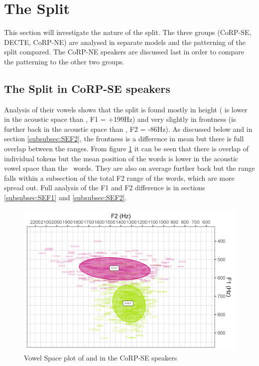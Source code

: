 \documentclass[../../../00.FullDoc/tex/ThesisSkeleton-draft2]{subfiles}
\begin{document}
\section{The  Split}	 \label{sec:FSSplit}
This section will investigate the nature of the \FS split. The three groups (CoRP-SE, DECTE, CoRP-NE) are analysed in separate models and the patterning of the \FS split compared. The CoRP-NE speakers are discussed last in order to compare the patterning to the other two groups.

\subsection{The  Split in CoRP-SE speakers}
Analysis of their vowels shows that the split is found mostly in height (\strutt{} is lower in the acoustic space than \foot{}, F1 = +199Hz) and very slightly in frontness (\strutt is further back in the acoustic space than \foot{}, F2 = -86Hz). As discussed below and in section \ref{subsubsec:SEF2}, the frontness is a difference in mean but there is full overlap between the ranges.
From figure \ref{fig:FSvplotSE} it can be seen that there is overlap of individual tokens but the mean position of the \strutt{} words is lower in the acoustic vowel space than the \foot\ words. They are also on average further back but the range falls within a subsection of the total F2 range of the  \foot{} words, which are more spread out.
Full analysis of the F1 and F2 difference is in sections \ref{subsubsec:SEF1} and \ref{subsubsec:SEF2}.


\begin{figure}[h]
	\centering
	\includegraphics[width=\textwidth]{../figures/FS-SE-vplot.png}
	\caption{Vowel Space plot of \foot{} and \strutt{} in the CoRP-SE speakers} \label{fig:FSvplotSE}
\end{figure}
\end{document}
